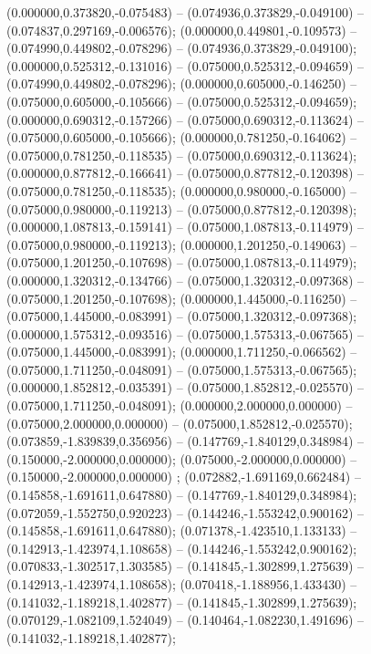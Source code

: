  (0.000000,0.373820,-0.075483) -- (0.074936,0.373829,-0.049100) -- (0.074837,0.297169,-0.006576);
 (0.000000,0.449801,-0.109573) -- (0.074990,0.449802,-0.078296) -- (0.074936,0.373829,-0.049100);
 (0.000000,0.525312,-0.131016) -- (0.075000,0.525312,-0.094659) -- (0.074990,0.449802,-0.078296);
 (0.000000,0.605000,-0.146250) -- (0.075000,0.605000,-0.105666) -- (0.075000,0.525312,-0.094659);
 (0.000000,0.690312,-0.157266) -- (0.075000,0.690312,-0.113624) -- (0.075000,0.605000,-0.105666);
 (0.000000,0.781250,-0.164062) -- (0.075000,0.781250,-0.118535) -- (0.075000,0.690312,-0.113624);
 (0.000000,0.877812,-0.166641) -- (0.075000,0.877812,-0.120398) -- (0.075000,0.781250,-0.118535);
 (0.000000,0.980000,-0.165000) -- (0.075000,0.980000,-0.119213) -- (0.075000,0.877812,-0.120398);
 (0.000000,1.087813,-0.159141) -- (0.075000,1.087813,-0.114979) -- (0.075000,0.980000,-0.119213);
 (0.000000,1.201250,-0.149063) -- (0.075000,1.201250,-0.107698) -- (0.075000,1.087813,-0.114979);
 (0.000000,1.320312,-0.134766) -- (0.075000,1.320312,-0.097368) -- (0.075000,1.201250,-0.107698);
 (0.000000,1.445000,-0.116250) -- (0.075000,1.445000,-0.083991) -- (0.075000,1.320312,-0.097368);
 (0.000000,1.575312,-0.093516) -- (0.075000,1.575313,-0.067565) -- (0.075000,1.445000,-0.083991);
 (0.000000,1.711250,-0.066562) -- (0.075000,1.711250,-0.048091) -- (0.075000,1.575313,-0.067565);
 (0.000000,1.852812,-0.035391) -- (0.075000,1.852812,-0.025570) -- (0.075000,1.711250,-0.048091);
 (0.000000,2.000000,0.000000) -- (0.075000,2.000000,0.000000) -- (0.075000,1.852812,-0.025570);
 (0.073859,-1.839839,0.356956) -- (0.147769,-1.840129,0.348984) -- (0.150000,-2.000000,0.000000);
 (0.075000,-2.000000,0.000000) -- (0.150000,-2.000000,0.000000) ;
 (0.072882,-1.691169,0.662484) -- (0.145858,-1.691611,0.647880) -- (0.147769,-1.840129,0.348984);
 (0.072059,-1.552750,0.920223) -- (0.144246,-1.553242,0.900162) -- (0.145858,-1.691611,0.647880);
 (0.071378,-1.423510,1.133133) -- (0.142913,-1.423974,1.108658) -- (0.144246,-1.553242,0.900162);
 (0.070833,-1.302517,1.303585) -- (0.141845,-1.302899,1.275639) -- (0.142913,-1.423974,1.108658);
 (0.070418,-1.188956,1.433430) -- (0.141032,-1.189218,1.402877) -- (0.141845,-1.302899,1.275639);
 (0.070129,-1.082109,1.524049) -- (0.140464,-1.082230,1.491696) -- (0.141032,-1.189218,1.402877);
